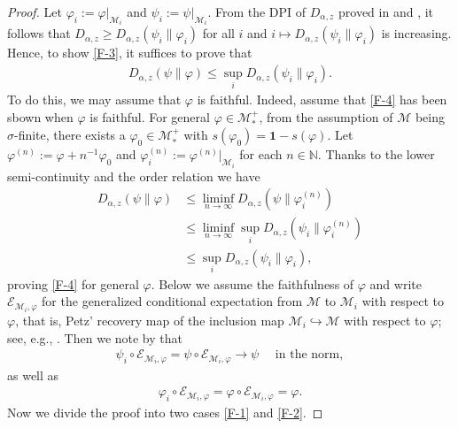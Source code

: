 \documentclass[11pt,reqno]{article}
\numberwithin{equation}{section}
\def\cM{\mathcal{M}}
\def\ffi{\varphi}
\def\bN{\mathbb{N}}
\def\1{\mathbf{1}}
\def\cE{\mathcal{E}}
\begin{document}
\begin{proof}
Let $\ffi_i:=\ffi|_{\cM_i}$ and $\psi_i:=\psi|_{\cM_i}$. From the DPI of $D_{\alpha,z}$ proved in
\cite[Theorem 1(viii)]{K} and \cite{J}, it follows that $D_{\alpha,z}\ge D_{\alpha,z}(\psi_i\|\ffi_i)$ for all $i$ and
$i\mapsto D_{\alpha,z}(\psi_i\|\ffi_i)$ is increasing. Hence, to show \eqref{F-3}, it suffices to prove that
\begin{align}\label{F-4}
D_{\alpha,z}(\psi\|\ffi)\le\sup_iD_{\alpha,z}(\psi_i\|\ffi_i).
\end{align}
To do this, we may assume that $\ffi$ is faithful. Indeed, assume that \eqref{F-4} has been sbown when $\ffi$ is
faithful. For general $\ffi\in\cM_*^+$, from the assumption of $\cM$ being $\sigma$-finite, there exists a
$\ffi_0\in\cM_*^+$ with $s(\ffi_0)=\1-s(\ffi)$. Let $\ffi^{(n)}:=\ffi+n^{-1}\ffi_0$ and $\ffi_i^{(n)}:=\ffi^{(n)}|_{\cM_i}$
for each $n\in\bN$. Thanks to the lower semi-continuity \cite[Theorem 1(iv) and Theorem 2(iv)]{K} and the order
relation \cite[Theorem 1(iii) and Theorem 2(iii)]{K} we have
\begin{align*}
D_{\alpha,z}(\psi\|\ffi)&\le\liminf_{n\to\infty}D_{\alpha,z}(\psi\|\ffi_i^{(n)}) \\
&\le\liminf_{n\to\infty}\sup_iD_{\alpha,z}(\psi_i\|\ffi_i^{(n)}) \\
&\le\sup_iD_{\alpha,z}(\psi_i\|\ffi_i),
\end{align*}
proving \eqref{F-4} for general $\ffi$. Below we assume the faithfulness of $\ffi$ and write $\cE_{\cM_i,\ffi}$
for the generalized conditional expectation from $\cM$ to $\cM_i$ with respect to $\ffi$, that is, Petz' recovery
map of the inclusion map $\cM_i\hookrightarrow\cM$ with respect to $\ffi$; see, e.g., \cite[Proposition 6.5]{Hi}.
Then we note by \cite[Theorem 3]{HT} that
\begin{align}\label{F-5}
\psi_i\circ\cE_{\cM_i,\ffi}=\psi\circ\cE_{\cM_i,\ffi}\to\psi\quad\mbox{ in the norm},
\end{align}
as well as
\begin{align}\label{F-6}
\ffi_i\circ\cE_{\cM_i,\ffi}=\ffi\circ\cE_{\cM_i,\ffi}=\ffi.
\end{align}
Now we divide the proof into two cases \eqref{F-1} and \eqref{F-2}.


\end{proof}
\end{document}
